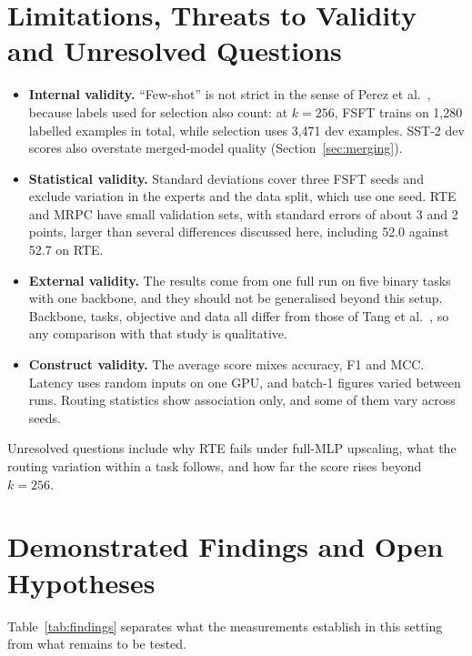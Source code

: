 \section{Limitations, Threats to Validity and Unresolved Questions}

\begin{itemize}
  \item \textbf{Internal validity.} ``Few-shot'' is not strict in the sense of Perez et al.~\cite{perez2021truefewshot}, because labels used for selection also count: at $k=256$, FSFT trains on 1,280 labelled examples in total, while selection uses 3,471 dev examples. SST-2 dev scores also overstate merged-model quality (Section~\ref{sec:merging}).
  \item \textbf{Statistical validity.} Standard deviations cover three FSFT seeds and exclude variation in the experts and the data split, which use one seed. RTE and MRPC have small validation sets, with standard errors of about 3 and 2 points, larger than several differences discussed here, including 52.0 against 52.7 on RTE.
  \item \textbf{External validity.} The results come from one full run on five binary tasks with one backbone, and they should not be generalised beyond this setup. Backbone, tasks, objective and data all differ from those of Tang et al.~\cite{tang2024wemoe}, so any comparison with that study is qualitative.
  \item \textbf{Construct validity.} The average score mixes accuracy, F1 and MCC. Latency uses random inputs on one GPU, and batch-1 figures varied between runs. Routing statistics show association only, and some of them vary across seeds.
\end{itemize}

Unresolved questions include why RTE fails under full-MLP upscaling, what the routing variation within a task follows, and how far the score rises beyond $k=256$.

\section{Demonstrated Findings and Open Hypotheses}

Table~\ref{tab:findings} separates what the measurements establish in this setting from what remains to be tested.

